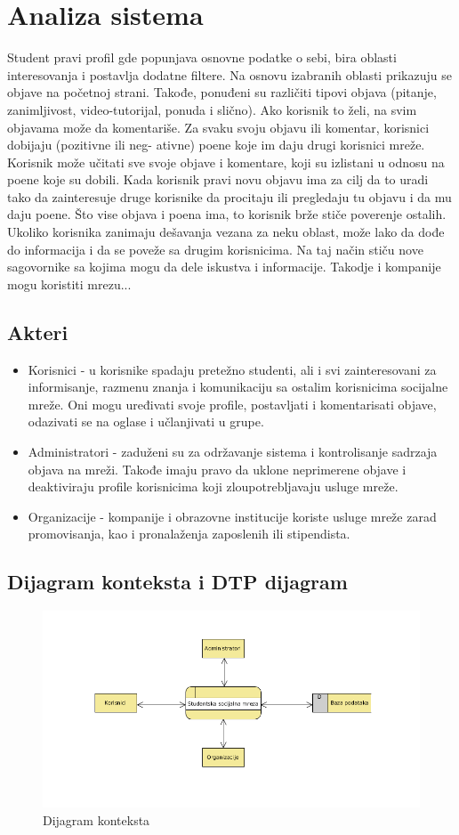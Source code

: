 \section{Analiza sistema}

Student pravi profil gde popunjava osnovne podatke o sebi, bira oblasti interesovanja i postavlja dodatne filtere. Na osnovu izabranih oblasti prikazuju se objave na početnoj strani. Takođe, ponuđeni
su različiti tipovi objava (pitanje, zanimljivost, video-tutorijal, ponuda i slično).
Ako korisnik to želi, na svim objavama može da komentariše.
Za svaku svoju objavu ili komentar, korisnici dobijaju (pozitivne ili neg-
ativne) poene koje im daju drugi korisnici mreže. Korisnik može
učitati sve svoje objave i komentare, koji su izlistani u odnosu na poene koje
su dobili. Kada korisnik pravi novu objavu ima za cilj da to uradi tako da
zainteresuje druge korisnike da procitaju ili pregledaju tu objavu i da mu
daju poene. Što vise objava i poena ima, to korisnik brže stiče poverenje
ostalih.
Ukoliko korisnika zanimaju dešavanja vezana za neku oblast, može lako da dođe do informacija i da se poveže sa drugim korisnicima. Na taj način stiču nove sagovornike sa kojima mogu da dele iskustva i informacije. Takodje i kompanije mogu koristiti mrezu...

\subsection{Akteri}
\begin{itemize}
    \item Korisnici - u korisnike spadaju pretežno studenti, ali i svi zainteresovani za informisanje, razmenu znanja i komunikaciju sa ostalim korisnicima socijalne mreže. Oni mogu uređivati svoje profile, postavljati i komentarisati objave, odazivati se na oglase i učlanjivati u grupe.
    \item Administratori - zaduženi su za održavanje sistema i kontrolisanje sadrzaja objava na mreži. Takođe imaju pravo da uklone neprimerene objave i deaktiviraju profile korisnicima koji zloupotrebljavaju usluge mreže.
    \item Organizacije - kompanije i obrazovne institucije koriste usluge mreže zarad promovisanja, kao i  pronalaženja zaposlenih ili stipendista.
\end{itemize}

\subsection{Dijagram konteksta i DTP dijagram}
\begin{figure}[h!]
    \centering
    \includegraphics[width=\linewidth]{slike/dijagram_konteksta.png}
    \caption{Dijagram konteksta}
    \label{fig:my_label}
\end{figure}
